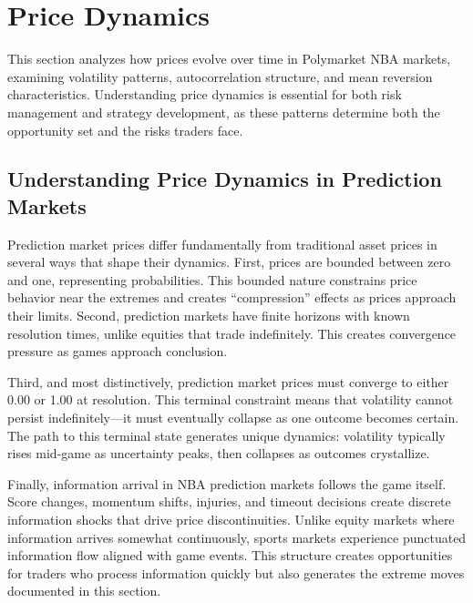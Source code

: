 
\chapter{Price Dynamics}
\label{sec:price-dynamics}

This section analyzes how prices evolve over time in Polymarket NBA markets, examining volatility patterns, autocorrelation structure, and mean reversion characteristics. Understanding price dynamics is essential for both risk management and strategy development, as these patterns determine both the opportunity set and the risks traders face.

\section{Understanding Price Dynamics in Prediction Markets}

Prediction market prices differ fundamentally from traditional asset prices in several ways that shape their dynamics. First, prices are bounded between zero and one, representing probabilities. This bounded nature constrains price behavior near the extremes and creates ``compression'' effects as prices approach their limits. Second, prediction markets have finite horizons with known resolution times, unlike equities that trade indefinitely. This creates convergence pressure as games approach conclusion.

Third, and most distinctively, prediction market prices must converge to either 0.00 or 1.00 at resolution. This terminal constraint means that volatility cannot persist indefinitely---it must eventually collapse as one outcome becomes certain. The path to this terminal state generates unique dynamics: volatility typically rises mid-game as uncertainty peaks, then collapses as outcomes crystallize.

Finally, information arrival in NBA prediction markets follows the game itself. Score changes, momentum shifts, injuries, and timeout decisions create discrete information shocks that drive price discontinuities. Unlike equity markets where information arrives somewhat continuously, sports markets experience punctuated information flow aligned with game events. This structure creates opportunities for traders who process information quickly but also generates the extreme moves documented in this section.

